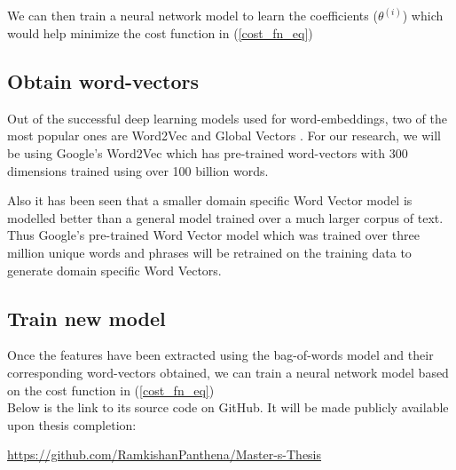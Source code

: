 \noindent We can then train a neural network model to learn the coefficients ($\theta^{(i)}$) which would help minimize the cost function in (\ref{cost_fn_eq})


\subsection{Obtain word-vectors}

Out of the successful deep learning models used for word-embeddings, two of the most popular ones are Word2Vec \cite{le2014distributed} and Global Vectors \cite{pennington2014glove}. For our research, we will be using Google's Word2Vec which has pre-trained word-vectors with 300 dimensions trained using over 100 billion words. 

Also it has been seen that a smaller domain specific Word Vector model is modelled better than a general model trained over a much larger corpus of text. Thus Google's pre-trained Word Vector model which was trained over three million unique words and phrases will be retrained on the training data to generate domain specific Word Vectors.

\subsection{Train new model}

Once the features have been extracted using the bag-of-words model and their corresponding word-vectors obtained, we can train a neural network model based on the cost function in (\ref{cost_fn_eq})\\

\noindent Below is the link to its source code on GitHub. It will be made publicly available upon thesis completion:

\noindent \url{https://github.com/RamkishanPanthena/Master-s-Thesis}